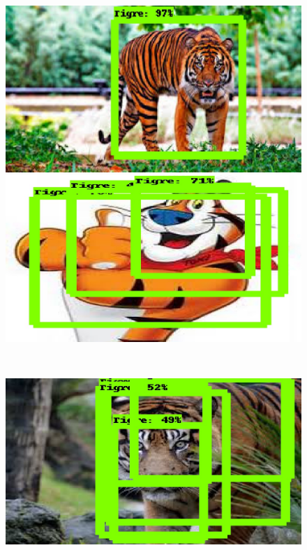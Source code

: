   \begin{figure}[H]
  \centering
  \begin{minipage}{0.46\textwidth}
    \centering
    \includegraphics[width=\linewidth]{figs/tigre_1.jpeg}
  \end{minipage}
  \hspace{2mm}
  \begin{minipage}{0.46\textwidth}
    \centering
    \includegraphics[width=\linewidth]{figs/tigre_2.jpeg}
  \end{minipage}
  \\[4mm] %
  \begin{minipage}{0.46\textwidth}
    \centering
    \includegraphics[width=\linewidth]{figs/tigre_4.jpeg}

\end{minipage}
\end{figure}

